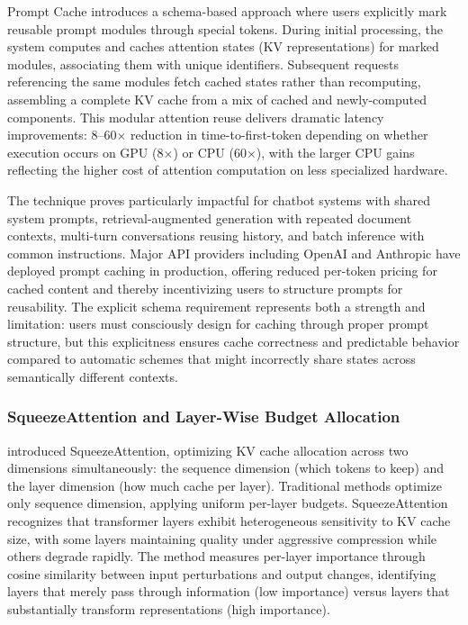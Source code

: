 Prompt Cache introduces a schema-based approach where users explicitly mark reusable prompt modules through special tokens. During initial processing, the system computes and caches attention states (KV representations) for marked modules, associating them with unique identifiers. Subsequent requests referencing the same modules fetch cached states rather than recomputing, assembling a complete KV cache from a mix of cached and newly-computed components. This modular attention reuse delivers dramatic latency improvements: 8--60$\times$ reduction in time-to-first-token depending on whether execution occurs on GPU (8$\times$) or CPU (60$\times$), with the larger CPU gains reflecting the higher cost of attention computation on less specialized hardware.

The technique proves particularly impactful for chatbot systems with shared system prompts, retrieval-augmented generation with repeated document contexts, multi-turn conversations reusing history, and batch inference with common instructions. Major API providers including OpenAI and Anthropic have deployed prompt caching in production, offering reduced per-token pricing for cached content and thereby incentivizing users to structure prompts for reusability. The explicit schema requirement represents both a strength and limitation: users must consciously design for caching through proper prompt structure, but this explicitness ensures cache correctness and predictable behavior compared to automatic schemes that might incorrectly share states across semantically different contexts.

\subsubsection{SqueezeAttention and Layer-Wise Budget Allocation}

\citet{li2024squeezeattention} introduced SqueezeAttention, optimizing KV cache allocation across two dimensions simultaneously: the sequence dimension (which tokens to keep) and the layer dimension (how much cache per layer). Traditional methods optimize only sequence dimension, applying uniform per-layer budgets. SqueezeAttention recognizes that transformer layers exhibit heterogeneous sensitivity to KV cache size, with some layers maintaining quality under aggressive compression while others degrade rapidly. The method measures per-layer importance through cosine similarity between input perturbations and output changes, identifying layers that merely pass through information (low importance) versus layers that substantially transform representations (high importance).

